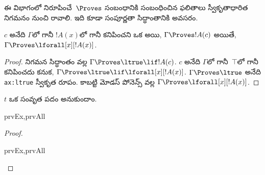 \documentclass[../../../include/open-logic-section]{subfiles}
\begin{document}


\begin{explain}
  ఈ విభాగంలో నిరూపించే~$\Proves$ సంబంధానికి సంబంధించిన ఫలితాలు స్వీకృతాధారిత
  నిగమనం నుంచి రావాలి. ఇది కూడా సంపూర్ణతా సిద్ధాంతానికి అవసరం.
\end{explain}

\begin{thm}
 $c$ అనేది $\Gamma$లో గానీ
$!A(x)$లో గానీ కనిపించని ఒక  అయి, $\Gamma \Proves
!A(c)$ అయితే, $\Gamma \Proves \lforall[x][!A(x)]$.
\end{thm}

\begin{proof}
నిగమన సిద్ధాంతం వల్ల $\Gamma \Proves \ltrue \lif !A(c)$. $c$ అనేది
$\Gamma$లో గానీ~$\top$లో గానీ కనిపించదు కనుక, $\Gamma \Proves
\ltrue \lif \lforall[x][!A(x)]$. $\Gamma \Proves \ltrue$ అనేది
\texttt{ax:ltrue} స్వీకృత రూపం. కాబట్టి మోడస్ పోనెన్స్ వల్ల $\Gamma
\Proves \lforall[x][!A(x)]$.
\end{proof}

\begin{prop}
 $t$ ఒక సంవృత పదం అనుకుందాం.
\begin{tagenumerate}{prvEx,prvAll}

\end{tagenumerate}
\end{prop}

\begin{proof}
\begin{tagenumerate}{prvEx,prvAll}
\end{tagenumerate}
\end{proof}
\end{document}
